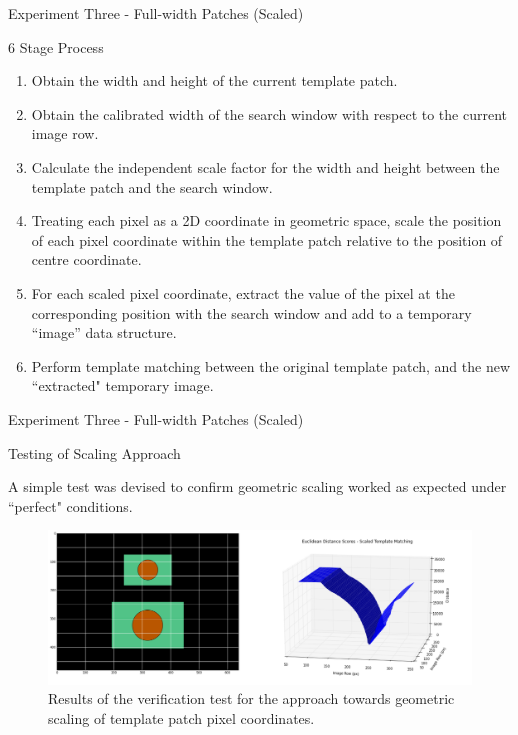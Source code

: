 \documentclass[10pt, compress]{beamer}
\begin{document}
\begin{frame}{Experiment Three - Full-width Patches (Scaled)}

\vspace{-5pt}
\begin{block}{6 Stage Process}
  \vspace{-5pt}
{\small \begin{enumerate}[label={\arabic*.}]
  \item Obtain the width and height of the current template patch.
  \item Obtain the calibrated width of the search window with respect to the current image row.
  \item Calculate the independent scale factor for the width and height between the template patch and the search window.
  \item Treating each pixel as a 2D coordinate in geometric space, scale the position of each pixel coordinate within the template patch relative to the position of centre coordinate.
  \item For each scaled pixel coordinate, extract the value of the pixel at the corresponding position with the search window and add to a temporary “image” data structure.
  \item Perform template matching between the original template patch, and the new ``extracted" temporary image.
 
\end{enumerate}}
	
\end{block}

\end{frame}


\begin{frame}{Experiment Three - Full-width Patches (Scaled)}
	
	\vspace{-5pt}
  \begin{block}{Testing of Scaling Approach}
  
 A simple test was devised to confirm geometric scaling worked as expected under ``perfect" conditions.
 \vspace{-15pt}
  		  \begin{figure}[ht!]
\centering
\includegraphics[scale=0.23]{scaling_verif}
 \caption{{\small Results of the verification test for the approach towards geometric scaling of template patch pixel coordinates.}}
\end{figure}
  		
  \end{block}


\end{frame}
\end{document}
